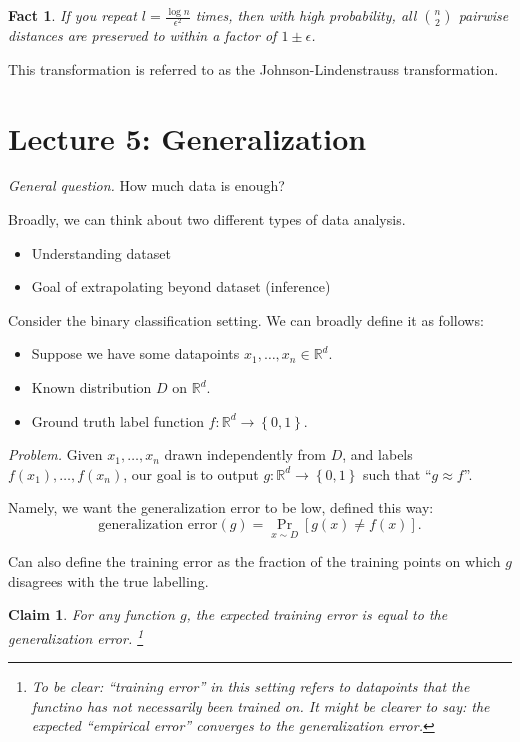 \documentclass[12pt]{article}
\newtheorem*{claim}{Claim}
\newtheorem*{fact}{Fact}
\newcommand{\RR}{\mathbb{R}}
\newcommand{\eps}{\epsilon}
\begin{document}
\begin{fact}
  If you repeat $l = \frac{\log n}{\eps^2}$ times, then with high probability, all $\binom{n}{2}$ pairwise distances are preserved to within a factor of $1 \pm \epsilon$.
\end{fact}

This transformation is referred to as the Johnson-Lindenstrauss transformation.


\section{Lecture 5: Generalization}

{\it General question.} How much data is enough?

Broadly, we can think about two different types of data analysis.

\begin{itemize}
  \item Understanding dataset
  \item Goal of extrapolating beyond dataset (inference)
\end{itemize}

Consider the binary classification setting.  We can broadly define it as follows:

\begin{itemize}
  \item Suppose we have some datapoints $x_1, \dots, x_n \in \RR^d$.
  \item Known distribution $D$ on $\RR^d$.
  \item Ground truth label function $f: \RR^d \to \left\{ 0, 1 \right\}$.
\end{itemize}

{\it Problem.} Given $x_1, \dots, x_n$ drawn independently from $D$, and labels $f(x_1), \dots, f(x_n)$, our goal is to output $g: \RR^d \to \left\{ 0, 1 \right\}$ such that ``$g \approx f$''.

Namely, we want the generalization error to be low, defined this way:
\[
  \text{generalization error}(g) = \Pr_{x \sim D} \left[ g(x) \neq f(x) \right].
\]

Can also define the training error as the fraction of the training points on which $g$ disagrees with the true labelling. \\

\begin{claim}
  For any function $g$, the expected training error is equal to the generalization error.  \footnote{To be clear: ``training error'' in this setting refers to datapoints that the functino has not necessarily been trained on.  It might be clearer to say: the expected ``empirical error'' converges to the generalization error.}
\end{claim}
\end{document}

